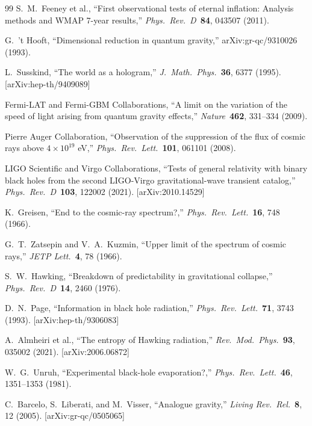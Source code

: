 \documentclass[11pt,a4paper]{article}
\theoremstyle{definition}
\theoremstyle{remark}
\begin{document}
\begin{thebibliography}{99}
S.~M.~Feeney et al., ``First observational tests of eternal inflation: Analysis methods and WMAP 7-year results,'' \emph{Phys.\ Rev.\ D}\ \textbf{84}, 043507 (2011).

G.~'t Hooft, ``Dimensional reduction in quantum gravity,'' arXiv:gr-qc/9310026 (1993).

L.~Susskind, ``The world as a hologram,'' \emph{J.\ Math.\ Phys.}\ \textbf{36}, 6377 (1995). [arXiv:hep-th/9409089]

Fermi-LAT and Fermi-GBM Collaborations, ``A limit on the variation of the speed of light arising from quantum gravity effects,'' \emph{Nature}\ \textbf{462}, 331--334 (2009).

Pierre Auger Collaboration, ``Observation of the suppression of the flux of cosmic rays above $4 \times 10^{19}$ eV,'' \emph{Phys.\ Rev.\ Lett.}\ \textbf{101}, 061101 (2008).

LIGO Scientific and Virgo Collaborations, ``Tests of general relativity with binary black holes from the second LIGO-Virgo gravitational-wave transient catalog,'' \emph{Phys.\ Rev.\ D}\ \textbf{103}, 122002 (2021). [arXiv:2010.14529]

K.~Greisen, ``End to the cosmic-ray spectrum?,'' \emph{Phys.\ Rev.\ Lett.}\ \textbf{16}, 748 (1966).

G.~T.~Zatsepin and V.~A.~Kuzmin, ``Upper limit of the spectrum of cosmic rays,'' \emph{JETP Lett.}\ \textbf{4}, 78 (1966).

S.~W.~Hawking, ``Breakdown of predictability in gravitational collapse,'' \emph{Phys.\ Rev.\ D}\ \textbf{14}, 2460 (1976).

D.~N.~Page, ``Information in black hole radiation,'' \emph{Phys.\ Rev.\ Lett.}\ \textbf{71}, 3743 (1993). [arXiv:hep-th/9306083]

A.~Almheiri et al., ``The entropy of Hawking radiation,'' \emph{Rev.\ Mod.\ Phys.}\ \textbf{93}, 035002 (2021). [arXiv:2006.06872]

W.~G.~Unruh, ``Experimental black-hole evaporation?,'' \emph{Phys.\ Rev.\ Lett.}\ \textbf{46}, 1351--1353 (1981).

C.~Barcelo, S.~Liberati, and M.~Visser, ``Analogue gravity,'' \emph{Living Rev.\ Rel.}\ \textbf{8}, 12 (2005). [arXiv:gr-qc/0505065]


\end{thebibliography}
\end{document}

